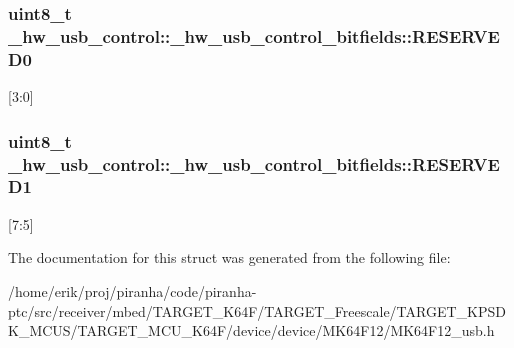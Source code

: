 \subsubsection[{\texorpdfstring{R\+E\+S\+E\+R\+V\+E\+D0}{RESERVED0}}]{\setlength{\rightskip}{0pt plus 5cm}uint8\+\_\+t \+\_\+hw\+\_\+usb\+\_\+control\+::\+\_\+hw\+\_\+usb\+\_\+control\+\_\+bitfields\+::\+R\+E\+S\+E\+R\+V\+E\+D0}\hypertarget{struct__hw__usb__control_1_1__hw__usb__control__bitfields_ac875127bca20e3cbcff8936915944c30}{}\label{struct__hw__usb__control_1_1__hw__usb__control__bitfields_ac875127bca20e3cbcff8936915944c30}
\mbox{[}3\+:0\mbox{]} 
\subsubsection[{\texorpdfstring{R\+E\+S\+E\+R\+V\+E\+D1}{RESERVED1}}]{\setlength{\rightskip}{0pt plus 5cm}uint8\+\_\+t \+\_\+hw\+\_\+usb\+\_\+control\+::\+\_\+hw\+\_\+usb\+\_\+control\+\_\+bitfields\+::\+R\+E\+S\+E\+R\+V\+E\+D1}\hypertarget{struct__hw__usb__control_1_1__hw__usb__control__bitfields_aea18ccb40ccf5d735a9606b5d9fd2fe8}{}\label{struct__hw__usb__control_1_1__hw__usb__control__bitfields_aea18ccb40ccf5d735a9606b5d9fd2fe8}
\mbox{[}7\+:5\mbox{]} 

The documentation for this struct was generated from the following file\+:\begin{DoxyCompactItemize}
\item 
/home/erik/proj/piranha/code/piranha-\/ptc/src/receiver/mbed/\+T\+A\+R\+G\+E\+T\+\_\+\+K64\+F/\+T\+A\+R\+G\+E\+T\+\_\+\+Freescale/\+T\+A\+R\+G\+E\+T\+\_\+\+K\+P\+S\+D\+K\+\_\+\+M\+C\+U\+S/\+T\+A\+R\+G\+E\+T\+\_\+\+M\+C\+U\+\_\+\+K64\+F/device/device/\+M\+K64\+F12/M\+K64\+F12\+\_\+usb.\+h\end{DoxyCompactItemize}
